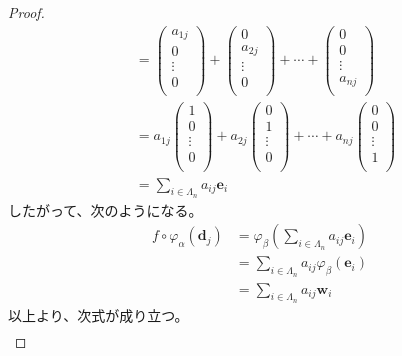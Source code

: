 \documentclass[dvipdfmx]{jsarticle}
\begin{document}
\begin{proof}
\begin{align*}
&= \begin{pmatrix}
a_{1j} \\
0 \\
 \vdots \\
0 \\
\end{pmatrix} + \begin{pmatrix}
0 \\
a_{2j} \\
 \vdots \\
0 \\
\end{pmatrix} + \cdots + \begin{pmatrix}
0 \\
0 \\
 \vdots \\
a_{nj} \\
\end{pmatrix}\\
&= a_{1j}\begin{pmatrix}
1 \\
0 \\
 \vdots \\
0 \\
\end{pmatrix} + a_{2j}\begin{pmatrix}
0 \\
1 \\
 \vdots \\
0 \\
\end{pmatrix} + \cdots + a_{nj}\begin{pmatrix}
0 \\
0 \\
 \vdots \\
1 \\
\end{pmatrix}\\
&= \sum_{i \in \varLambda_{n}} {a_{ij}\mathbf{e}_{i}}
\end{align*}
したがって、次のようになる。
\begin{align*}
f \circ \varphi_{\alpha}\left( \mathbf{d}_{j} \right) &= \varphi_{\beta}\left( \sum_{i \in \varLambda_{n}} {a_{ij}\mathbf{e}_{i}} \right)\\
&= \sum_{i \in \varLambda_{n}} {a_{ij}\varphi_{\beta}\left( \mathbf{e}_{i} \right)} \\
&= \sum_{i \in \varLambda_{n}} {a_{ij}\mathbf{w}_{i}}
\end{align*}
以上より、次式が成り立つ。
\begin{align*}

\end{align*}
\end{proof}
\end{document}
